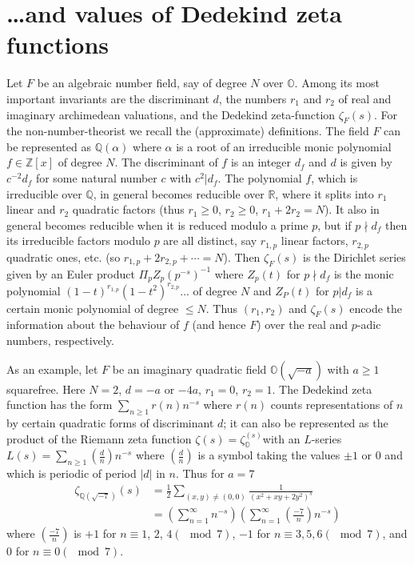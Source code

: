 \section{\ldots and values of Dedekind zeta functions}\label{art15-sec5}
Let $F$ be an algebraic number field, say of degree $N$ over $\mathbb{O}$. Among its most important invariants are the discriminant $d$, the numbers $r_{1}$ and $r_{2}$ of real and imaginary archimedean valuations, and the Dedekind zeta-function $\zeta_{F}(s)$. For the non-number-theorist we recall the (approximate) definitions. The field $F$ can be represented as $\mathbb{Q}(\alpha)$ where $\alpha$ is a root of an irreducible monic polynomial $f\in \mathbb{Z}[x]$ of degree $N$. The discriminant of $f$ is an integer $d_{f}$ and $d$ is given by $c^{-2}d_{f}$ for some natural number $c$ with $c^{2}|d_{f}$. The polynomial $f$, which is irreducible over $\mathbb{Q}$, in general becomes reducible over $\mathbb{R}$, where it splits into $r_{1}$ linear and $r_{2}$ quadratic factors (thus $r_{1}\geq 0$, $r_{2}\geq 0$, $r_{1}+2r_{2}=N$). It also in general becomes reducible when it is reduced modulo a prime $p$, but if $p\nmid d_{f}$ then its irreducible factors modulo $p$ are all distinct, say $r_{1,p}$ linear factors, $r_{2,p}$ quadratic ones, etc. (so $r_{1,p}+2r_{2,p}+\cdots =N$). Then $\zeta_{F}(s)$ is the Dirichlet series given by an Euler product $\Pi_{p}Z_{p}(p^{-s})^{-1}$ where $Z_{p}(t)$ for $p\nmid d_{f}$ is the monic polynomial $(1-t)^{r_{1,p}}(1-t^{2})^{r_{2,p}}\ldots$ of degree $N$ and $Z_{P}(t)$ for $p|d_{f}$ is a certain monic polynomial of degree $\leq N$. Thus $(r_{1},r_{2})$ and $\zeta_{F}(s)$ encode the information about the behaviour of $f$ (and hence $F$) over the real and $p$-adic numbers, respectively.

As an example, let $F$ be an imaginary quadratic field $\mathbb{O}(\sqrt{-a})$ with $a\geq 1$ squarefree. Here $N=2$, $d=-a$ or $-4a$, $r_{1}=0$, $r_{2}=1$. The Dedekind zeta function has the form $\sum\limits_{n\geq 1}r(n)n^{-s}$ where $r(n)$ counts representations of $n$ by certain quadratic forms of discriminant $d$; it can also be represented as the product of the Riemann zeta function $\zeta(s)=\zeta^{(s)}_{\mathbb{O}}$\pageoriginale with an $L$-series $L(s)=\sum\limits_{n\geq 1}\left(\frac{d}{n}\right)n^{-s}$ where $\left(\frac{d}{n}\right)$ is a symbol taking the values $\pm 1$ or $0$ and which is periodic of period $|d|$ in $n$. Thus for $a=7$
\begin{align*}
\zeta_{\mathbb{Q}(\sqrt{-7})}(s) &= \frac{1}{2}\sum\limits_{(x,y)\neq (0,0)}\frac{1}{(x^{2}+xy+2y^{2})^{s}}\\
&= \left(\sum\limits^{\infty}_{n=1}n^{-s}\right)\left(\sum\limits^{\infty}_{n=1}\left(\frac{-7}{n}\right)n^{-s}\right)
\end{align*}
where $\left(\frac{-7}{n}\right)$ is $+1$ for $n\equiv 1$, $2$, $4(\mod 7)$, $-1$ for $n\equiv 3,5,6(\mod 7)$, and $0$ for $n\equiv 0(\mod 7)$.

